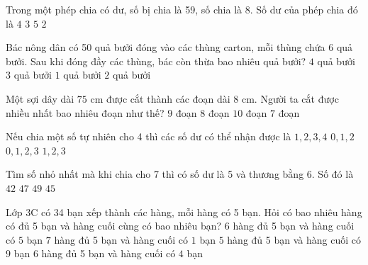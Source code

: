 \begin{ex} %
Trong một phép chia có dư, số bị chia là 59, số chia là 8. Số dư của phép chia đó là
\choice
{$4$}
{\True $3$}
{$5$}
{$2$}
\end{ex}

\begin{ex} %
Bác nông dân có 50 quả bưởi đóng vào các thùng carton, mỗi thùng chứa 6 quả bưởi. Sau khi đóng đầy các thùng, bác còn thừa bao nhiêu quả bưởi?
\choice
{$4$ quả bưởi}
{$3$ quả bưởi}
{$1$ quả bưởi}
{\True $2$ quả bưởi}
\end{ex}

\begin{ex} %
Một sợi dây dài $75\text{ cm}$ được cắt thành các đoạn dài $8\text{ cm}$. Người ta cắt được nhiều nhất bao nhiêu đoạn như thế?
\choice
{\True $9$ đoạn}
{$8$ đoạn}
{$10$ đoạn}
{$7$ đoạn}
\end{ex}

\begin{ex} %
Nếu chia một số tự nhiên cho 4 thì các số dư có thể nhận được là
\choice
{$1, 2, 3, 4$}
{$0, 1, 2$}
{\True $0, 1, 2, 3$}
{$1, 2, 3$}
\end{ex}

\begin{ex} %
Tìm số nhỏ nhất mà khi chia cho 7 thì có số dư là 5 và thương bằng 6. Số đó là
\choice
{$42$}
{\True $47$}
{$49$}
{$45$}
\end{ex}

\begin{ex} %
Lớp 3C có 34 bạn xếp thành các hàng, mỗi hàng có 5 bạn. Hỏi có bao nhiêu hàng có đủ 5 bạn và hàng cuối cùng có bao nhiêu bạn?
\choice
{$6$ hàng đủ 5 bạn và hàng cuối có $5$ bạn}
{$7$ hàng đủ 5 bạn và hàng cuối có $1$ bạn}
{$5$ hàng đủ 5 bạn và hàng cuối có $9$ bạn}
{\True $6$ hàng đủ 5 bạn và hàng cuối có $4$ bạn}
\end{ex}

